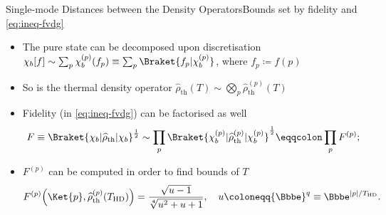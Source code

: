 \documentclass{beamer}
\newcommand{\ee}{{\Bbbe}}
\newcommand{\rbr}[1]{{\left(#1\right)}}
\newcommand{\vbr}[1]{{\left|#1\right|}}
\newcommand{\rfun}[2]{{#1}\mathopen{}\left(#2\right)\mathclose{}}
\newcommand{\sfun}[2]{{#1}\mathopen{}\left[#2\right]\mathclose{}}
\newcommand{\what}[1]{{\widehat{#1}}}
\begin{document}
\begin{frame}[allowframebreaks]{Single-mode Distances between the Density 
Operators}{Bounds set by fidelity and \cref{eq:ineq-fvdg}}

\begin{itemize}


\item The pure state can be decomposed upon discretisation 
$\sfun{\chi_b}{f} \sim \sum_p \rfun{\chi_b^\rbr{p}}{f_p} \equiv \sum_p 
\Braket{f_p | \chi_b^{\rbr{p}}}$, where $f_p \coloneqq \rfun{f}{p}$

\item So is the thermal density operator $\rfun{\what{\rho}_\text{th}}{T} \sim
\bigotimes_p \rfun{\what{\rho}_\text{th}^\rbr{p}}{T}$

\item Fidelity (in \cref{eq:ineq-fvdg}) can be factorised as well
\begin{equation}
F \equiv \Braket{\chi_b | \what{\rho}_\text{th} | \chi_b}^\frac{1}{2} \sim
\prod_p \Braket{\chi_b^{\rbr{p}} | \what{\rho}_\text{th}^{\rbr{p}}
| \chi_b^{\rbr{p}}}^\frac{1}{2} \eqqcolon \prod_p F^{\rbr{p}};
\end{equation}
\item $F^{\rbr{p}}$ can be computed \alert{in order to find bounds of $T$}
\begin{equation}
\rfun{F^{\rbr{p}}}{\Ket{p},\rfun{\what{\rho}_\text{th}^\rbr{p}}{T_\text{HD}}}
= \frac{\sqrt{u-1}}{\sqrt[4]{u^2+u+1}},\quad
u \coloneqq \ee^q \equiv \ee^{\vbr{p}/T_\text{HD}}.
\label{eq:fidelity-pt}
\end{equation}
\end{itemize}

\begin{center}

\end{center}

\end{frame}
\end{document}

